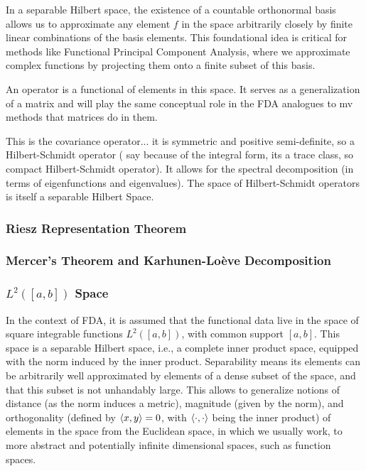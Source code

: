 In a separable Hilbert space, the existence of a countable orthonormal basis allows us to 
approximate any element \( f \) in the space arbitrarily closely by finite linear combinations 
of the basis elements. This foundational idea is critical for methods like Functional Principal 
Component Analysis, where we approximate complex functions by projecting them onto a finite 
subset of this basis.



An operator is a functional of elements in this space. It serves as a generalization of
a matrix and will play the same conceptual role in the FDA analogues to mv methods
that matrices do in them.

This is the covariance operator... it is symmetric and positive semi-definite, so
a Hilbert-Schmidt operator (\textcite{WangChiouMüller2016} say because of the integral form,
its a trace class, so compact Hilbert-Schmidt operator). It allows for the spectral
decomposition (in terms of eigenfunctions and eigenvalues). The space of Hilbert-Schmidt
operators is itself a separable Hilbert Space.

\subsubsection{Riesz Representation Theorem}
\label{sec:riesz}

\subsubsection{Mercer's Theorem and Karhunen-Loève Decomposition}
\label{sec:mercer and kh}

\subsubsection{$L^2([a, b])$ Space}
\label{sec:l2 space}
In the context of FDA, it is assumed that the functional data live in
the space of square integrable functions $L^2([a,b])$, with common
support $[a,b]$. This space is a separable Hilbert space, i.e., a complete inner
product space, equipped with the norm induced by the inner product. Separability means
its elements can be arbitrarily well approximated by elements of a dense subset of the
space, and that this subset is not unhandably large.
This allows to generalize notions of distance (as the norm induces a
metric), magnitude (given by the norm), and orthogonality (defined by
$\left \langle x, y \right \rangle = 0$, with $\left \langle \cdot, \cdot \right \rangle$ being the inner product) of elements
in the space from the Euclidean space, in which we usually work, to more
abstract and potentially infinite dimensional spaces, such as function
spaces.


